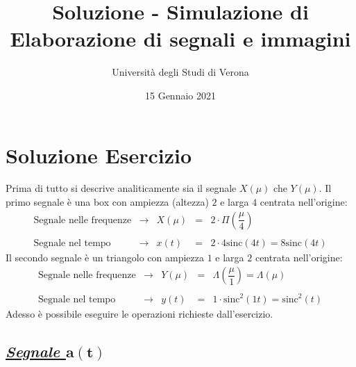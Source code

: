 \documentclass[a4paper]{article}
\begin{document}
	\author{Università degli Studi di Verona}
	\title{Soluzione - Simulazione di Elaborazione di segnali e immagini}
	\date{{\Large 15 Gennaio 2021}}
	\maketitle
	
	\section{Soluzione Esercizio}
	
	Prima di tutto si descrive analiticamente sia il segnale $X\left(\mu\right)$ che $Y\left(\mu\right)$. Il primo segnale è una box con ampiezza (altezza) $2$ e larga $4$ centrata nell'origine:
	\begin{equation*}
		\begin{array}{lllll}
			\text{Segnale nelle frequenze} & \longrightarrow & X\left(\mu\right) & = & 2 \cdot \Pi\left(\dfrac{\mu}{4}\right) \\
			\\
			\text{Segnale nel tempo} & \longrightarrow & x\left(t\right) & = & 2 \cdot 4 \mathrm{sinc}\left(4t\right) = 8\mathrm{sinc}\left(4t\right)
		\end{array}
	\end{equation*}
	Il secondo segnale è un triangolo con ampiezza $1$ e larga $2$ centrata nell'origine:
	\begin{equation*}
		\begin{array}{lllll}
			\text{Segnale nelle frequenze} & \longrightarrow & Y\left(\mu\right) & = & \Lambda\left(\dfrac{\mu}{1}\right) = \Lambda\left(\mu\right) \\
			\\
			\text{Segnale nel tempo} & \longrightarrow & y\left(t\right) & = & 1 \cdot \mathrm{sinc}^{2}\left(1t\right) = \mathrm{sinc}^{2}\left(t\right)
		\end{array}
	\end{equation*}
	Adesso è possibile eseguire le operazioni richieste dall'esercizio.\newpage
	
	\subsection*{\textcolor{Green4}{\underline{\textbf{\emph{Segnale $\boldsymbol{a\left(t\right)}$}}}}}
	
\end{document}
